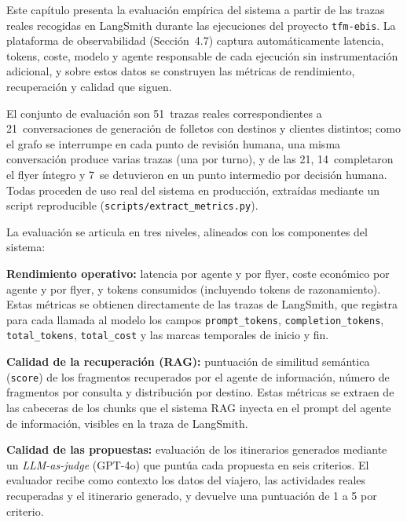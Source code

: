 \clearpage
{}

Este capítulo presenta la evaluación empírica del sistema a partir de las trazas reales recogidas en LangSmith durante las ejecuciones del proyecto \texttt{tfm-ebis}. La plataforma de observabilidad (Sección~4.7) captura automáticamente latencia, tokens, coste, modelo y agente responsable de cada ejecución sin instrumentación adicional, y sobre estos datos se construyen las métricas de rendimiento, recuperación y calidad que siguen.

El conjunto de evaluación son 51~trazas reales correspondientes a 21~conversaciones de generación de folletos con destinos y clientes distintos; como el grafo se interrumpe en cada punto de revisión humana, una misma conversación produce varias trazas (una por turno), y de las 21, 14~completaron el flyer íntegro y 7~se detuvieron en un punto intermedio por decisión humana. Todas proceden de uso real del sistema en producción, extraídas mediante un script reproducible (\texttt{scripts/extract\_metrics.py}).

\label{sec:metodologia}
La evaluación se articula en tres niveles, alineados con los componentes del sistema:

\begin{tfmbullets}
\item \textbf{Rendimiento operativo:} latencia por agente y por flyer, coste económico por agente y por flyer, y tokens consumidos (incluyendo tokens de razonamiento). Estas métricas se obtienen directamente de las trazas de LangSmith, que registra para cada llamada al modelo los campos \texttt{prompt\_tokens}, \texttt{completion\_tokens}, \texttt{total\_tokens}, \texttt{total\_cost} y las marcas temporales de inicio y fin.
\item \textbf{Calidad de la recuperación (RAG):} puntuación de similitud semántica (\texttt{score}) de los fragmentos recuperados por el agente de información, número de fragmentos por consulta y distribución por destino. Estas métricas se extraen de las cabeceras de los chunks que el sistema RAG inyecta en el prompt del agente de información, visibles en la traza de LangSmith.
\item \textbf{Calidad de las propuestas:} evaluación de los itinerarios generados mediante un \textit{LLM-as-judge} (GPT-4o) que puntúa cada propuesta en seis criterios. El evaluador recibe como contexto los datos del viajero, las actividades reales recuperadas y el itinerario generado, y devuelve una puntuación de 1 a 5 por criterio.
\end{tfmbullets}

